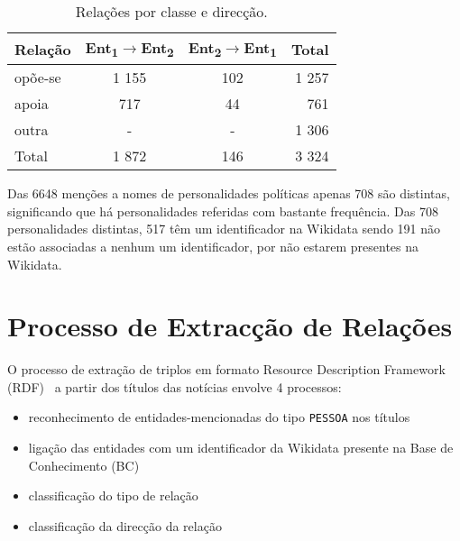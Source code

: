 \documentclass[a4paper, twocolumn, 11pt, twoside]{article}
\begin{document}

\begin{table}
    \begin{center}
    \begin{tabular}{l ccr}
        {\bf Relação} & {\bf \footnotesize{Ent\textsubscript{1}$\rightarrow$Ent\textsubscript{2}}} & {\bf \footnotesize{Ent\textsubscript{2}$\rightarrow$Ent\textsubscript{1}}} & {\bf Total} \\
        \hline
        opõe-se          &  1 155  &  102  &  1 257  \\
        apoia            &    717  &   44  &    761  \\
        outra            &    -    &   -   &  1 306  \\
		\hline
		Total			 &  1 872  &  146  &  3 324  \\
    \end{tabular}
	\caption{Relações por classe e direcção.}
	\label{tab:rel_dataset}
	\end{center}
\end{table}


Das 6648 menções a nomes de personalidades políticas apenas 708 são distintas, significando que há personalidades referidas com bastante frequência. Das 708 personalidades distintas, 517 têm um identificador na Wikidata sendo 191 não estão associadas a nenhum um identificador, por não estarem presentes na Wikidata.

\section{Processo de Extracção de Relações}
\label{sec:classifiers}

O processo de extração de triplos em formato Resource Description Framework (RDF)~\citep{schreiber2014primer} a partir dos títulos das notícias envolve 4 processos: 

\begin{itemize}
\item reconhecimento de entidades-mencionadas do tipo \texttt{PESSOA} nos títulos
\item ligação das entidades com um identificador da Wikidata presente na Base de Conhecimento (BC)
\item classificação do tipo de relação
\item classificação da direcção da relação
\end{itemize}
\end{document}
